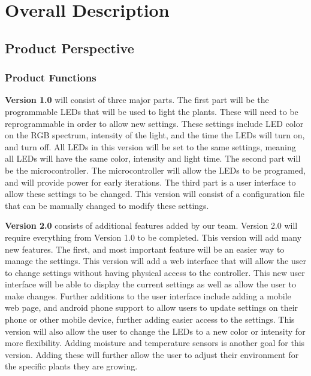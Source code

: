 \documentclass[onecolumn, draftclsnofoot,10pt, compsoc]{IEEEtran}
\begin{document}
	\section{Overall Description}
		\subsection{Product Perspective}

		\subsubsection{Product Functions}
		\noindent \textbf{Version 1.0} will consist of three major parts. The first part will be the programmable LEDs that will be used to light the plants. These will need to be reprogrammable in order to allow new settings.
		These settings include LED color on the RGB spectrum, intensity of the light, and the time the LEDs will turn on, and turn off. All LEDs in this version will be set to the same settings, meaning all
		LEDs will have the same color, intensity and light time. The second part will be the microcontroller. The microcontroller will allow the LEDs to be programed, and will provide power for early iterations.
		The third part is a user interface to allow these settings to be changed. This version will consist of a configuration file that can be manually changed to modify these settings.

		\noindent \textbf{Version 2.0} consists of additional features added by our team. Version 2.0 will require everything from Version 1.0 to be completed. This version will add many new features. The first, and most
		important feature will be an easier way to manage the settings. This version will add a web interface that will allow the user to change settings without having physical access to the controller.
		This new user interface will be able to display the current settings as well as allow the user to make changes. Further additions to the user interface include adding a mobile web page, and android
		phone support to allow users to update settings on their phone or other mobile device, further adding easier access to the settings. This version will also allow the user to change the LEDs to a new color or intensity for more flexibility. Adding moisture and temperature sensors is another goal for this version. Adding these will further allow the user to adjust
		their environment for the specific plants they are growing.
\end{document}

